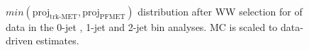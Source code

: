 \begin{figure}[!hbtp]
\centering
{}
\\
\caption{$min(\text{proj}_\text{trk-MET}, \text{proj}_\text{PFMET})$ distribution after WW selection for \intlumiEightTeV of data in the 0-jet , 
1-jet  and 2-jet  bin analyses. 
MC is scaled to data-driven estimates.}
\label{fig:ww_pmet}
\end{figure}


